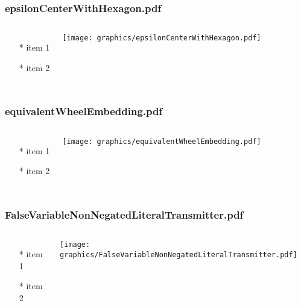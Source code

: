 \documentclass{beamer}
\begin{document}
\begin{frame} \frametitle{epsilonCenterWithHexagon.pdf}
    \begin{columns}[c]
        \begin{itemize}
            \item[*] item 1
            \item[*] item 2
        \end{itemize}
        \begin{minipage}{\linewidth}
            \begin{center}
            \texttt{[image: graphics/epsilonCenterWithHexagon.pdf]}
            \label{gfx:epsilonCenterWithHexagon.pdf}
            \end{center}
        \end{minipage}
    \end{columns}
\end{frame}
\begin{frame} \frametitle{equivalentWheelEmbedding.pdf}
    \begin{columns}[c]
        \begin{itemize}
            \item[*] item 1
            \item[*] item 2
        \end{itemize}
        \begin{minipage}{\linewidth}
            \begin{center}
            \texttt{[image: graphics/equivalentWheelEmbedding.pdf]}
            \label{gfx:equivalentWheelEmbedding.pdf}
            \end{center}
        \end{minipage}
    \end{columns}
\end{frame}
\begin{frame} \frametitle{FalseVariableNonNegatedLiteralTransmitter.pdf}
    \begin{columns}[c]
        \begin{itemize}
            \item[*] item 1
            \item[*] item 2
        \end{itemize}
        \begin{minipage}{\linewidth}
            \begin{center}
            \texttt{[image: graphics/FalseVariableNonNegatedLiteralTransmitter.pdf]}
            \label{gfx:FalseVariableNonNegatedLiteralTransmitter.pdf}
            \end{center}
        \end{minipage}
    \end{columns}
\end{frame}
\end{document}
